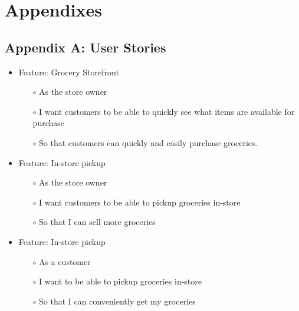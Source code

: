 \documentclass{scrreprt}
\theoremstyle{funreq}
\begin{document}
	
	\chapter{Appendixes}
	
	
	\section{Appendix A: User Stories}
	
	
	\begin{itemize}
		\item Feature: Grocery Storefront
		\begin{itemize}
			\item[$\circ$]As the store owner
			\item[$\circ$]I want customers to be able to quickly see  what items are available for purchase
			\item[$\circ$]So that customers can quickly and easily purchase groceries.
		\end{itemize}
	\end{itemize}
	
	\begin{itemize}
		\item Feature: In-store pickup
		\begin{itemize}
			\item[$\circ$]As the store owner
			\item[$\circ$]I want customers to be able to pickup groceries in-store
			\item[$\circ$]So that I can sell more groceries
		\end{itemize}
	\end{itemize}
	
	\begin{itemize}
		\item Feature: In-store pickup
		\begin{itemize}
			\item[$\circ$]As a customer
			\item[$\circ$]I want to be able to pickup groceries in-store
			\item[$\circ$]So that I can conveniently get my groceries
		\end{itemize}
	\end{itemize}
	
\end{document}
